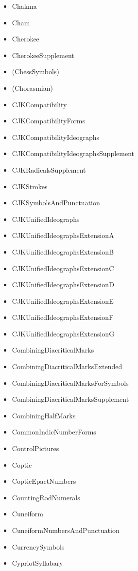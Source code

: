 \documentclass{article}
\newenvironment{itemlist}{%
  \begin{itemize}
  \setlength{\itemsep}{0pt}
  \setlength{\parsep}{0pt}
  \setlength{\topsep}{0pt}
  \setlength{\partopsep}{0pt}
  \setlength{\parskip}{0pt}
  \setlength{\labelsep}{5pt}}%
{
  \end{itemize}}
\begin{document}
\begin{multicols*}{2}
\begin{itemlist}
        \item Chakma
        \item Cham
        \item Cherokee
        \item CherokeeSupplement
        \item (ChessSymbols)
        \item (Chorasmian)
        \item CJKCompatibility
        \item CJKCompatibilityForms
        \item CJKCompatibilityIdeographs
        \item CJKCompatibilityIdeographsSupplement
        \item CJKRadicalsSupplement
        \item CJKStrokes
        \item CJKSymbolsAndPunctuation
        \item CJKUnifiedIdeographs
        \item CJKUnifiedIdeographsExtensionA
        \item CJKUnifiedIdeographsExtensionB
        \item CJKUnifiedIdeographsExtensionC
        \item CJKUnifiedIdeographsExtensionD
        \item CJKUnifiedIdeographsExtensionE
        \item CJKUnifiedIdeographsExtensionF
        \item CJKUnifiedIdeographsExtensionG
        \item CombiningDiacriticalMarks
        \item CombiningDiacriticalMarksExtended
        \item CombiningDiacriticalMarksForSymbols
        \item CombiningDiacriticalMarksSupplement
        \item CombiningHalfMarks
        \item CommonIndicNumberForms
        \item ControlPictures
        \item Coptic
        \item CopticEpactNumbers
        \item CountingRodNumerals
        \item Cuneiform
        \item CuneiformNumbersAndPunctuation
        \item CurrencySymbols
        \item CypriotSyllabary

\end{itemlist}
\end{multicols*}
\end{document}
